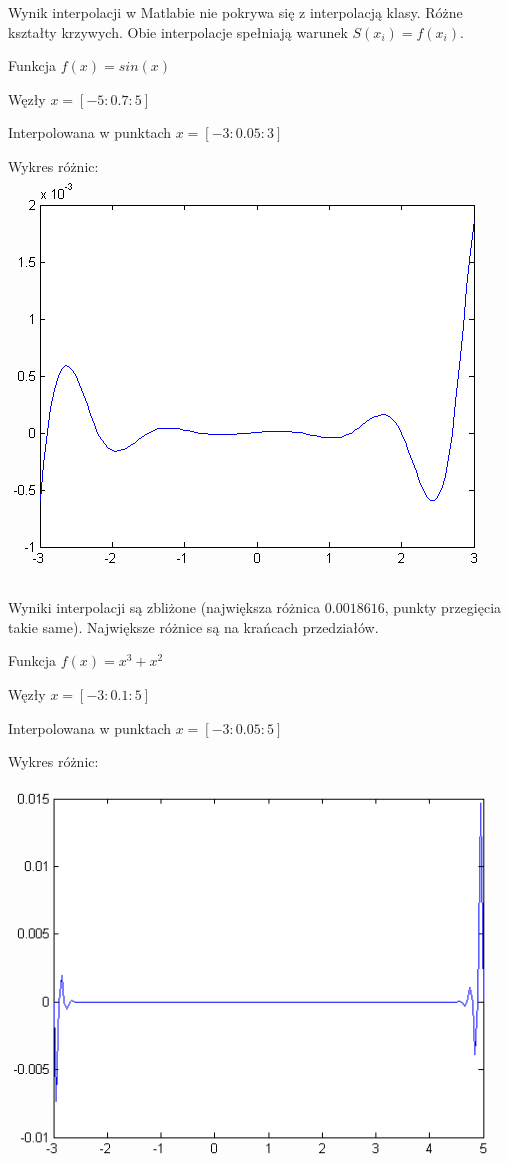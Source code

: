 \documentclass[a4paper,11pt,notitlepage]{article}
\begin{document}
Wynik interpolacji w Matlabie nie pokrywa się z interpolacją klasy. Różne kształty krzywych. Obie interpolacje spełniają warunek $S(x_i) = f(x_i)$.

Funkcja $f(x) = sin(x)$

Węzły $x = [-5:0.7:5]$

Interpolowana w punktach $x = [-3:0.05:3]$

Wykres różnic:\\
\includegraphics{spline3.png}

Wyniki interpolacji są zbliżone (największa różnica $0.0018616$, punkty przegięcia takie same). Największe różnice są na krańcach przedziałów.

Funkcja $f(x) = x^3 + x^2$

Węzły $x = [-3:0.1:5]$

Interpolowana w punktach $x = [-3:0.05:5]$

Wykres różnic:\\
\includegraphics{spline4.png}
\end{document}
